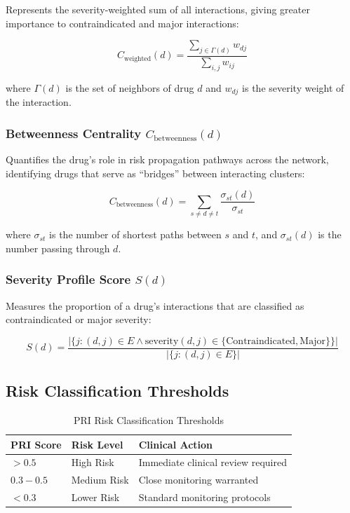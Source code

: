 \documentclass[11pt,a4paper]{article}
\begin{document}
Represents the severity-weighted sum of all interactions, giving greater importance to contraindicated and major interactions:

\begin{equation}
C_{\text{weighted}}(d) = \frac{\sum_{j \in \Gamma(d)} w_{dj}}{\sum_{i,j} w_{ij}}
\end{equation}

where $\Gamma(d)$ is the set of neighbors of drug $d$ and $w_{dj}$ is the severity weight of the interaction.

\subsubsection{Betweenness Centrality $C_{\text{betweenness}}(d)$}

Quantifies the drug's role in risk propagation pathways across the network, identifying drugs that serve as ``bridges'' between interacting clusters:

\begin{equation}
C_{\text{betweenness}}(d) = \sum_{s \neq d \neq t} \frac{\sigma_{st}(d)}{\sigma_{st}}
\end{equation}

where $\sigma_{st}$ is the number of shortest paths between $s$ and $t$, and $\sigma_{st}(d)$ is the number passing through $d$.

\subsubsection{Severity Profile Score $S(d)$}

Measures the proportion of a drug's interactions that are classified as contraindicated or major severity:

\begin{equation}
S(d) = \frac{|\{j : (d,j) \in E \land \text{severity}(d,j) \in \{\text{Contraindicated}, \text{Major}\}\}|}{|\{j : (d,j) \in E\}|}
\end{equation}

\subsection{Risk Classification Thresholds}

\begin{table}[H]
\centering
\caption{PRI Risk Classification Thresholds}
\label{tab:pri_thresholds}
\begin{tabular}{lll}
\toprule
\textbf{PRI Score} & \textbf{Risk Level} & \textbf{Clinical Action} \\
\midrule
$> 0.5$ & High Risk & Immediate clinical review required \\
$0.3 - 0.5$ & Medium Risk & Close monitoring warranted \\
$< 0.3$ & Lower Risk & Standard monitoring protocols \\
\bottomrule
\end{tabular}
\end{table}
\end{document}
